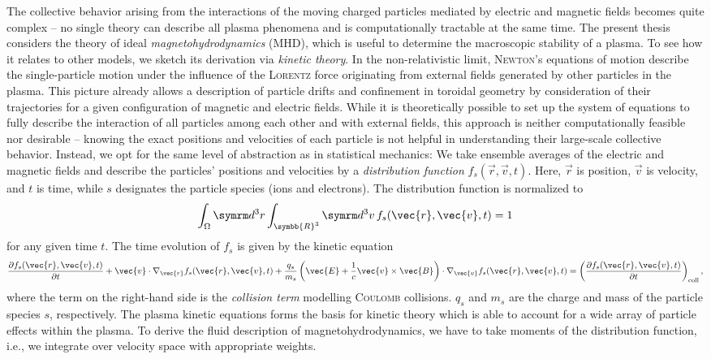 The collective behavior arising from the interactions of the moving charged particles mediated by electric and magnetic fields becomes quite complex -- no single theory can describe all plasma phenomena and is computationally tractable at the same time. The present thesis considers the theory of ideal \emph{magnetohydrodynamics} (MHD), which is useful to determine the macroscopic stability of a plasma. To see how it relates to other models, we sketch its derivation via \emph{kinetic theory}. In the non-relativistic limit, \textsc{Newton}'s equations of motion describe the single-particle motion under the influence of the \textsc{Lorentz} force originating from external fields generated by other particles in the plasma. This picture already allows a description of particle drifts and confinement in toroidal geometry by consideration of their trajectories for a given configuration of magnetic and electric fields. While it is theoretically possible to set up the system of equations to fully describe the interaction of all particles among each other and with external fields, this approach is neither computationally feasible nor desirable -- knowing the exact positions and velocities of each particle is not helpful in understanding their large-scale collective behavior. Instead, we opt for the same level of abstraction as in statistical mechanics: We take ensemble averages of the electric and magnetic fields and describe the particles' positions and velocities by a \emph{distribution function} $f_{s} (\vec{r}, \vec{v}, t)$. Here, $\vec{r}$ is position, $\vec{v}$ is velocity, and $t$ is time, while $s$ designates the particle species (ions and electrons). The distribution function is normalized to
\begin{gather}
  \int_{\Omega} \diff^{3} r \int_{\symbb{R}^{3}} \diff^{3} v \, f_{s} (\vec{r}, \vec{v}, t) = 1
\end{gather}
for any given time $t$. The time evolution of $f_{s}$ is given by the kinetic equation
\begin{gather}
  \pd[f_{s} (\vec{r}, \vec{v}, t)]{t} + \vec{v} \cdot \grad_{\vec{r}} f_{s} (\vec{r}, \vec{v}, t) + \frac{q_{s}}{m_{s}} \left ( \vec{E} + \frac{1}{c} \vec{v} \times \vec{B} \right ) \cdot \grad_{\vec{v}} f_{s} (\vec{r}, \vec{v}, t) = \left ( \pd[f_{s} (\vec{r}, \vec{v}, t)]{t} \right )_{\text{coll}},
\end{gather}
where the term on the right-hand side is the \emph{collision term} modelling \textsc{Coulomb} collisions. $q_{s}$ and $m_{s}$ are the charge and mass of the particle species $s$, respectively. The plasma kinetic equations forms the basis for kinetic theory which is able to account for a wide array of particle effects within the plasma. To derive the fluid description of magnetohydrodynamics, we have to take moments of the distribution function, i.e., we integrate over velocity space with appropriate weights.

